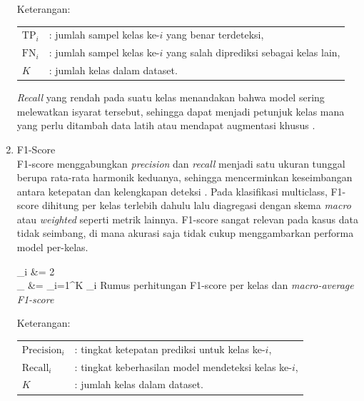 \begin{enumerate}
	\noindent Keterangan:

\begingroup
	\footnotesize
\begin{tabular}{@{}ll}
	$\mathrm{TP}_i$ & : jumlah sampel kelas ke-$i$ yang benar terdeteksi, \\
	$\mathrm{FN}_i$ & : jumlah sampel kelas ke-$i$ yang salah diprediksi sebagai kelas lain, \\
	$K$ & : jumlah kelas dalam dataset. \\
	\end{tabular}
	\endgroup

	\vspace{0.5cm}
	\textit{Recall} yang rendah pada suatu kelas menandakan bahwa model sering melewatkan isyarat tersebut, sehingga dapat menjadi petunjuk kelas mana yang perlu ditambah data latih atau mendapat augmentasi khusus \cite{Raschka2020}.\par

	\item F1-Score \\
	F1-score menggabungkan \textit{precision} dan \textit{recall} menjadi satu ukuran tunggal berupa rata-rata harmonik keduanya, sehingga mencerminkan keseimbangan antara ketepatan dan kelengkapan deteksi \cite{Raschka2020}. Pada klasifikasi multiclass, F1-score dihitung per kelas terlebih dahulu lalu diagregasi dengan skema \textit{macro} atau \textit{weighted} seperti metrik lainnya. F1-score sangat relevan pada kasus data tidak seimbang, di mana akurasi saja tidak cukup menggambarkan performa model per-kelas.\par
	\vspace{0.5cm}
	\begin{equationcaptioned}[eq:2.f1]{
		_i &= 2 \times {} \\
		_{} &= \sum_{i=1}^{K} _i
	}{
		Rumus perhitungan F1-score per kelas dan \textit{macro-average F1-score}
	}\end{equationcaptioned}
	\vspace{0.5cm}

	\noindent Keterangan:

\begingroup
	\footnotesize
\begin{tabular}{@{}ll}
	$\mathrm{Precision}_i$ & : tingkat ketepatan prediksi untuk kelas ke-$i$, \\
	$\mathrm{Recall}_i$ & : tingkat keberhasilan model mendeteksi kelas ke-$i$, \\
	$K$ & : jumlah kelas dalam dataset. \\
	\end{tabular}
	\endgroup


\end{enumerate}
